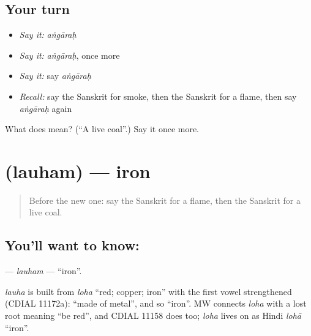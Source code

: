 \subsection*{Your turn}
\begin{itemize}
\raggedright
  \item \emph{Say it:} \emph{aṅgāraḥ}
  \item \emph{Say it:} \emph{aṅgāraḥ}, once more
  \item \emph{Say it:} say \emph{aṅgāraḥ}
  \item \emph{Recall:} say the Sanskrit for smoke, then the Sanskrit for a flame, then say \emph{aṅgāraḥ} again
\end{itemize}

\begin{tcolorbox}[breakable,colback=teal!4,colframe=teal!35!black,title={Before you move on}]
What does  mean? (\textquotedblleft{}A live coal\textquotedblright{}.) Say it once more.
\end{tcolorbox}
\section[\texorpdfstring{\sk{लौहम्} (lauham)}{लौहम् (lauham)}]{ (lauham) — iron}

\label{lesson:SA-C165-lauham}



\begin{quote}
Before the new one: say the Sanskrit for a flame, then the Sanskrit for a live coal.
\end{quote}

\subsection*{You'll want to know: }
\textbf{} — \emph{lauham} — \textquotedblleft{}iron\textquotedblright{}.

\begin{cousinweb}
\emph{lauha} is built from \emph{loha} \textquotedblleft{}red; copper; iron\textquotedblright{} with the first vowel strengthened (CDIAL 11172a): \textquotedblleft{}made of metal\textquotedblright{}, and so \textquotedblleft{}iron\textquotedblright{}. MW connects \emph{loha} with a lost root meaning \textquotedblleft{}be red\textquotedblright{}, and CDIAL 11158 does too; \emph{loha} lives on as Hindi \emph{lohā} \textquotedblleft{}iron\textquotedblright{}.
\end{cousinweb}

